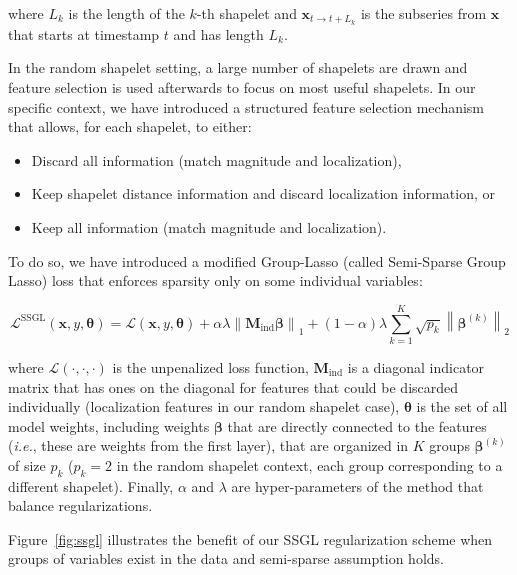 where $L_k$ is the length of the $k$-th shapelet and
$\mathbf{x}_{t \rightarrow t+L_k}$
is the subseries from $\mathbf{x}$ that starts at timestamp $t$ and has length
$L_k$.

In the random shapelet setting, a large number of shapelets are drawn and
feature selection is used afterwards to focus on most useful shapelets.
In our specific context, we have introduced a structured feature selection
mechanism that allows, for each shapelet, to either:

\begin{itemize}
\item Discard all information (match magnitude and localization),
\item Keep shapelet distance information and discard localization information,
or
\item Keep all information (match magnitude and localization).
\end{itemize}

To do so, we have introduced a modified Group-Lasso (called
Semi-Sparse Group Lasso) loss that enforces sparsity only on some individual
variables:

\begin{equation}
    \mathcal{L}^{\mathrm{SSGL}}(\mathbf{x}, y, \boldsymbol{\theta}) =
        \mathcal{L}(\mathbf{x}, y, \boldsymbol{\theta})
        + \alpha \lambda
            \left\| \mathbf{M}_\text{ind} \boldsymbol{\beta} \right\|_1
        + (1-\alpha) \lambda \sum_{k=1}^{K} \sqrt{p_k}
            \left\| \boldsymbol{\beta}^{(k)} \right\|_2
\end{equation}

\noindent
where $\mathcal{L}(\cdot,\cdot,\cdot)$ is the unpenalized
loss function,
$\mathbf{M}_\text{ind}$ is a diagonal indicator matrix that has ones on
the diagonal for features that could be discarded individually (localization
features in our random shapelet case), $\boldsymbol{\theta}$ is the set of
all model weights, including weights $\boldsymbol{\beta}$ that are directly
connected to the features (\emph{i.e.}, these are weights from the first layer),
that
are organized in $K$ groups $\boldsymbol{\beta}^{(k)}$ of size $p_k$
($p_k=2$ in the
random shapelet context, each group corresponding to a different shapelet).
Finally, $\alpha$ and $\lambda$ are hyper-parameters of the method that balance
regularizations.

Figure~\ref{fig:ssgl} illustrates the benefit of our SSGL regularization scheme
when groups of variables exist in the data and semi-sparse assumption holds.

